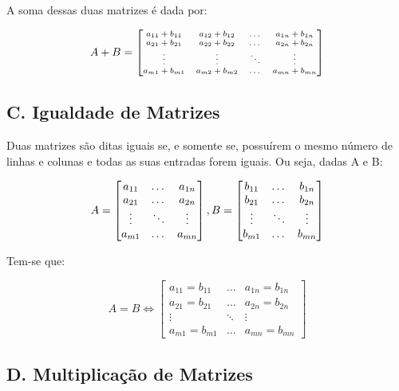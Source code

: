 \documentclass[twocolumn, 10pt]{extarticle}
\begin{document}
A soma dessas duas matrizes é dada por:

\[\scriptsize
A+B=
\begin{bmatrix}
a_{11} + b_{11} & a_{12} + b_{12} & \dots & a_{1n} + b_{1n} \\
a_{21} + b_{21} & a_{22} + b_{22} & \dots & a_{2n} + b_{2n} \\
\vdots & \vdots & \ddots & \vdots \\
a_{m1} + b_{m1} & a_{m2} + b_{m2} & \dots & a_{mn} + b_{mn} 

\end{bmatrix}
\]

\subsection*{C. \quad Igualdade de Matrizes}

Duas matrizes são ditas iguais se, e somente se, possuírem o mesmo número de linhas e colunas e todas as suas entradas forem iguais. Ou seja, dadas A e B:

\[ 
A = 
\begin{bmatrix}
a_{11} & \dots & a_{1n} \\
a_{21} & \dots & a_{2n} \\
\vdots & \ddots & \vdots \\
a_{m1} & \dots & a_{mn} 

\end{bmatrix},  \\ 
B = 
\begin{bmatrix}
b_{11}  & \dots & b_{1n} \\
b_{21}  & \dots & b_{2n} \\
\vdots  & \ddots & \vdots \\
b_{m1}  & \dots & b_{mn} 

\end{bmatrix}
\]

Tem-se que:

\[ 
A = B \iff
\begin{bmatrix}
a_{11} = b_{11}  & \dots & a_{1n} = b_{1n} \\
a_{21} = b_{21}  & \dots & a_{2n} = b_{2n} \\
\vdots & \ddots  & \vdots \\
a_{m1} = b_{m1}  & \dots & a_{mn} = b_{mn} 

\end{bmatrix}
\]

\subsection*{D. \quad Multiplicação de Matrizes}
\end{document}
